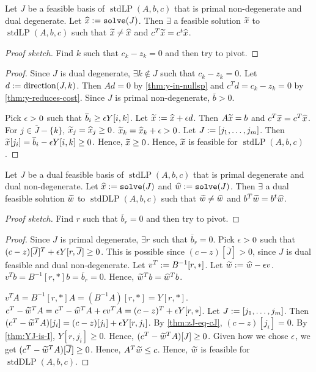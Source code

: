 \documentclass[a4paper, 12pt, fleqn]{article}
\newcommand*{\Jcomp}{\overline{J}}
\newcommand*{\bline}{\overline{b}}
\DeclareMathOperator{\stdLP}{stdLP}
\DeclareMathOperator{\stdDLP}{stdDLP}
\DeclareMathOperator{\direction}{direction}
\DeclareMathOperator{\solve}{\mathtt{solve}}
\newenvironment*{longProof}{\begin{proof}}{\end{proof}}
\begin{document}
\begin{lemma}
Let $J$ be a feasible basis of $\stdLP(A, b, c)$ that is primal non-degenerate and dual degenerate.
Let $\xhat \defeq \solve(J)$. Then $\exists$ a feasible solution $\widetilde{x}$ to $\stdLP(A, b, c)$
such that $\widetilde{x} \neq \widehat{x}$ and $c^T\widetilde{x} = c^t\widehat{x}$.
\end{lemma}
\begin{proof}[Proof sketch]
Find $k$ such that $c_k - z_k = 0$ and then try to pivot.
\end{proof}
\begin{longProof}
Since $J$ is dual degenerate, $\exists k \not\in J$ such that $c_k - z_k = 0$.
Let $d \defeq \direction(J, k)$. Then $Ad = 0$ by \cref{thm:y-in-nullsp}
and $c^Td = c_k - z_k = 0$ by \cref{thm:y-reduces-cost}.
Since $J$ is primal non-degenerate, $\bline > 0$.

Pick $\epsilon > 0$ such that $\bline_i \ge \eps Y[i, k]$.
Let $\widetilde{x} := \widehat{x} + \epsilon d$. Then $A\widetilde{x} = b$ and $c^T\widetilde{x} = c^T\widehat{x}$.
For $j \in \Jcomp - \{k\}$, $\widetilde{x}_j = \widehat{x}_j \ge 0$. $\widetilde{x}_k = \widehat{x}_k + \epsilon > 0$.
Let $J := [j_1, \ldots, j_m]$. Then $\xtild[j_i] = \bline_i - \eps Y[i,k] \ge 0$.
Hence, $\widetilde{x} \ge 0$. Hence, $\widetilde{x}$ is feasible for $\stdLP(A, b, c)$.
\end{longProof}

\begin{lemma}
Let $J$ be a dual feasible basis of $\stdLP(A, b, c)$ that is primal degenerate and dual non-degenerate.
Let $\xhat \defeq \solve(J)$ and $\what \defeq \solve(J)$.
Then $\exists$ a dual feasible solution $\widetilde{w}$ to $\stdDLP(A, b, c)$
such that $\widetilde{w} \neq \widehat{w}$ and $b^T\widetilde{w} = b^t\widehat{w}$.
\end{lemma}
\begin{proof}[Proof sketch]
Find $r$ such that $\bline_r = 0$ and then try to pivot.
\end{proof}
\begin{longProof}
Since $J$ is primal degenerate, $\exists r$ such that $\bline_r = 0$.
Pick $\epsilon > 0$ such that $(c-z)[\Jcomp]^T + \eps Y[r,\Jcomp] \ge 0$.
This is possible since $(c-z)[\Jcomp] > 0$, since $J$ is dual feasible and dual non-degenerate.
Let $v^T := B^{-1}[r,*]$. Let $\widetilde{w} := \widehat{w} - \epsilon v$.
$v^Tb = B^{-1}[r,*]b = \bline_r = 0$. Hence, $\widetilde{w}^Tb = \widehat{w}^Tb$.

$v^TA = B^{-1}[r,*]A = (B^{-1}A)[r,*] = Y[r,*]$.
$c^T - \widetilde{w}^TA = c^T - \widehat{w}^TA + \epsilon v^TA = (c-z)^T + \epsilon Y[r,*]$.
Let $J := [j_1, \ldots, j_m]$. Then
$(c^T - \widetilde{w}^TA)[j_i] = (c-z)[j_i] + \epsilon Y[r,j_i]$.
By \cref{thm:zJ-eq-cJ}, $(c-z)[j_i] = 0$.
By \cref{thm:YJ-is-I}, $Y[r,j_i] \ge 0$.
Hence, $(c^T - \widetilde{w}^TA)[J] \ge 0$. Given how we chose $\epsilon$,
we get $(c^T - \wtild^TA)[\Jcomp] \ge 0$. Hence, $A^T\widetilde{w} \le c$.
Hence, $\widetilde{w}$ is feasible for $\stdDLP(A, b, c)$.
\end{longProof}
\end{document}
